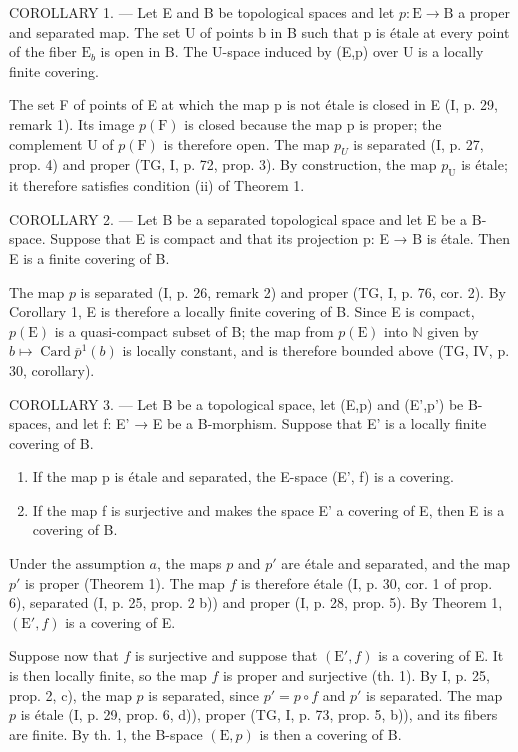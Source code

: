 COROLLARY 1. --- Let E and B be topological spaces and let \(p\colon\mathrm{E}\to\mathrm{B}\) a proper and separated map. The set U of points b in B such that p is étale at every point of the fiber \(\mathrm{E}_{b}\) is open in B. The U-space induced by (E,p) over U is a locally finite covering.

The set F of points of E at which the map p is not étale is closed in E (I, p. 29, remark 1). Its image \(p(\mathrm{F})\) is closed because the map p is proper; the complement U of \(p(\mathrm{F})\) is therefore open. The map \(p_{U}\) is separated (I, p. 27, prop. 4) and proper (TG, I, p. 72, prop. 3). By construction, the map \(p_{\mathrm{U}}\) is étale; it therefore satisfies condition (ii) of Theorem 1.

COROLLARY 2. — Let B be a separated topological space and let E be a B-space. Suppose that E is compact and that its projection p: E → B is étale. Then E is a finite covering of B.

The map \(p\) is separated (I, p. 26, remark 2) and proper (TG, I, p. 76, cor. 2). By Corollary 1, E is therefore a locally finite covering of B. Since E is compact, \(p(\mathrm{E})\) is a quasi-compact subset of B; the map from \(p(\mathrm{E})\) into \(\mathbb{N}\) given by \(b \mapsto \operatorname{Card} \overline{p}^1(b)\) is locally constant, and is therefore bounded above (TG, IV, p. 30, corollary).

COROLLARY 3. --- Let B be a topological space, let (E,p) and (E',p') be B-spaces, and let f: E' → E be a B-morphism. Suppose that E' is a locally finite covering of B.

\begin{enumerate}
\def\labelenumi{\alph{enumi})}
\item
  If the map p is étale and separated, the E-space (E', f) is a covering.
\item
  If the map f is surjective and makes the space E' a covering of E, then E is a covering of B.
\end{enumerate}

Under the assumption \(a\), the maps \(p\) and \(p'\) are étale and separated, and the map \(p'\) is proper (Theorem 1). The map \(f\) is therefore étale (I, p. 30, cor. 1 of prop. 6), separated (I, p. 25, prop. 2 b)) and proper (I, p. 28, prop. 5). By Theorem 1, \((\mathrm{E}', f)\) is a covering of E.

Suppose now that \(f\) is surjective and suppose that \((\mathrm{E}', f)\) is a covering of E. It is then locally finite, so the map \(f\) is proper and surjective (th. 1). By I, p. 25, prop. 2, c), the map \(p\) is separated, since \(p' = p \circ f\) and \(p'\) is separated. The map \(p\) is étale (I, p. 29, prop. 6, d)), proper (TG, I, p. 73, prop. 5, b)), and its fibers are finite. By th. 1, the B-space \((\mathrm{E}, p)\) is then a covering of B.

